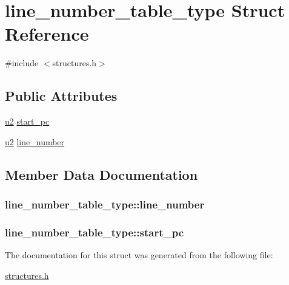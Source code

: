 \hypertarget{structline__number__table__type}{}\section{line\+\_\+number\+\_\+table\+\_\+type Struct Reference}
\label{structline__number__table__type}


{\ttfamily \#include $<$structures.\+h$>$}

\subsection*{Public Attributes}
\begin{DoxyCompactItemize}
\item 
\hyperlink{structures_8h_a55ef8d87fd202b8417704c089899c5b9}{u2} \hyperlink{structline__number__table__type_ac0e263d3f0484fb8bea365e8b87398e1}{start\+\_\+pc}
\item 
\hyperlink{structures_8h_a55ef8d87fd202b8417704c089899c5b9}{u2} \hyperlink{structline__number__table__type_ac9f2fe3d86343b8eb013f969fa31314c}{line\+\_\+number}
\end{DoxyCompactItemize}


\subsection{Member Data Documentation}
\subsubsection[{\texorpdfstring{line\+\_\+number}{line_number}}]{ line\+\_\+number\+\_\+table\+\_\+type\+::line\+\_\+number}\hypertarget{structline__number__table__type_ac9f2fe3d86343b8eb013f969fa31314c}{}\label{structline__number__table__type_ac9f2fe3d86343b8eb013f969fa31314c}
\subsubsection[{\texorpdfstring{start\+\_\+pc}{start_pc}}]{ line\+\_\+number\+\_\+table\+\_\+type\+::start\+\_\+pc}\hypertarget{structline__number__table__type_ac0e263d3f0484fb8bea365e8b87398e1}{}\label{structline__number__table__type_ac0e263d3f0484fb8bea365e8b87398e1}


The documentation for this struct was generated from the following file\+:\begin{DoxyCompactItemize}
\item 
\hyperlink{structures_8h}{structures.\+h}\end{DoxyCompactItemize}
